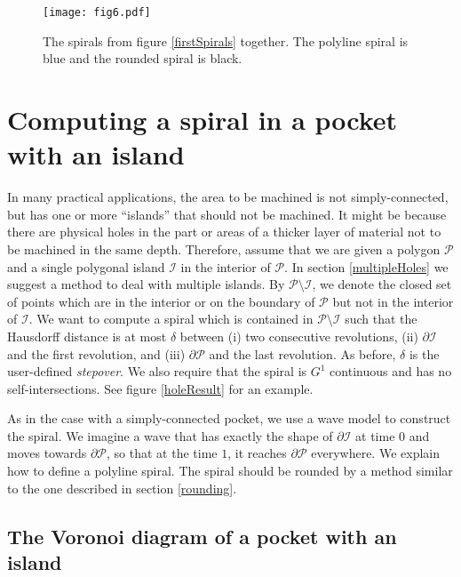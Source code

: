 \documentclass[3p]{elsarticle}
\newcommand{\PP}{\mathcal{P}}
\newcommand{\HH}{\mathcal{I}}
\newcommand{\stepover}{\delta}
\begin{document}
\begin{figure*}
\centering
\texttt{[image: fig6.pdf]}
\label{spiralRounding}
\caption{The spirals from figure \ref{firstSpirals} together. The polyline spiral is blue and the rounded
spiral is black.}
\end{figure*}

\section{Computing a spiral in a pocket with an island}\label{pocketWithHole}

In many practical applications, the area to be machined is not simply-connected,
but has one or more ``islands'' that should not be machined. It might be because there are
physical holes in the part or areas of a thicker layer of material not to be machined in the same depth.
Therefore, assume that we are
given a polygon $\PP$ and a single polygonal island $\HH$ in the interior of $\PP$. In
section \ref{multipleHoles} we suggest a method to deal with multiple islands.
By $\PP\setminus\HH$, we denote the closed set of points which are in the interior or
on the boundary of $\PP$ but not in the interior of $\HH$.
We want to compute a spiral which
is contained in $\PP\setminus\HH$ such that the Hausdorff distance is at most
$\stepover$ between (i) two consecutive revolutions,
(ii) $\partial\HH$ and the first revolution, and (iii) $\partial\PP$ and the last revolution.
As before, $\stepover$ is the user-defined \emph{stepover}.
We also require
that the spiral is $G^1$ continuous and
has no self-intersections. See figure \ref{holeResult} for an example.

As in the case with a simply-connected pocket, we use a wave model to construct the spiral.
We imagine a wave that has exactly the shape of $\partial\HH$ at time $0$ and moves
towards $\partial\PP$, so that at the time $1$, it reaches $\partial\PP$ everywhere.
We explain how to define a polyline spiral. The spiral should be rounded by a method similar to the one
described in section \ref{rounding}. 

\subsection{The Voronoi diagram of a pocket with an island}
\end{document}
